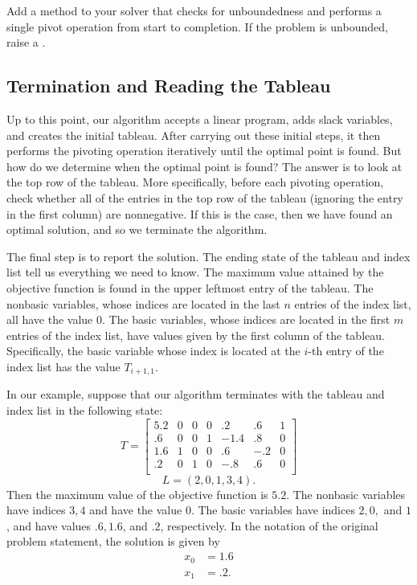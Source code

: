 \begin{problem}
Add a method to your solver that checks for unboundedness and performs a single pivot operation from start to completion.
If the problem is unbounded, raise a .
\end{problem}

\subsection*{Termination and Reading the Tableau}
Up to this point, our algorithm accepts a linear program, adds slack variables, and creates the initial tableau. After
carrying out these initial steps, it then performs the pivoting operation iteratively until the optimal point is found.
But how do we determine when the optimal point is found? The answer is to look at the top row of the tableau. More specifically,
before each pivoting operation, check whether all of the entries in the top row of the tableau (ignoring the entry in the first
column) are nonnegative. If this is the case, then we have found an optimal solution, and so we terminate the algorithm.

The final step is to report the solution. The ending state of the tableau and index list tell us everything we need to know.
The maximum value attained by the objective function is found in the upper leftmost entry of the tableau. The nonbasic variables,
whose indices are located in the last $n$ entries of the index list, all have the value $0$. The basic variables, whose indices
are located in the first $m$ entries of the index list, have values given by the first column of the tableau. Specifically, the basic
variable whose index is located at the $i$-th entry of the index list has the value $T_{i+1, 1}$.

In our example, suppose that our algorithm terminates with the tableau and index list in the following state:
\[
T = \begin{bmatrix}
5.2 & 0 & 0 & 0 & .2 & .6 & 1\\
.6 & 0 & 0 & 1 & -1.4 & .8 & 0\\
1.6 & 1 & 0 & 0 & .6 & -.2 & 0\\
.2 & 0 & 1 & 0 & -.8 & .6 & 0\\
\end{bmatrix}
\]
\[
L = (2, 0, 1, 3, 4).
\]
Then the maximum value of the objective function is $5.2$. The nonbasic variables have indices $3, 4$ and have the value $0$.
The basic variables have indices $2, 0,$ and $1$, and have values $.6, 1.6$, and $.2$, respectively.
In the notation of the original problem statement, the solution is given by
\begin{align*}
x_0 &= 1.6\\
x_1 &= .2.
\end{align*}

